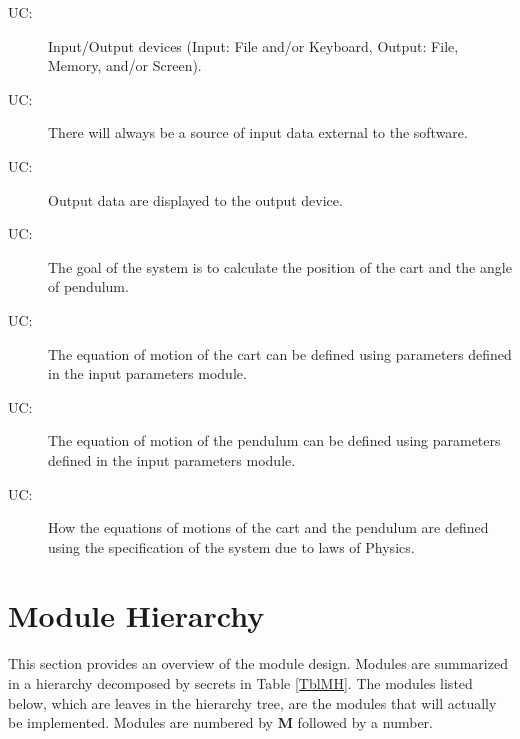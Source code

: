 \documentclass[12pt, titlepage]{article}
\newcounter{ucnum}
\newcommand{\uctheucnum}{UC\theucnum}
\begin{document}
\begin{description}
\item[ \uctheucnum \label{ucIO}:] Input/Output devices (Input: File and/or Keyboard, Output: File, Memory, and/or Screen).
\item[ \uctheucnum \label{ucInput}:] There will always be a source of input data external to the software.
\item[ \uctheucnum \label{ucOutput}:] Output data are displayed to the output device.
\item[ \uctheucnum \label{ucGoal}:] The goal of the system is to calculate the position of the cart and the angle of pendulum.
\item[ \uctheucnum \label{ucODEstructureC}:] The equation of motion of the cart can be defined using parameters defined in the input parameters module.
\item[ \uctheucnum \label{ucODEstructureP}:] The equation of motion of the pendulum can be defined using parameters defined in the input parameters module.
\item[ \uctheucnum \label{ucEqM}:] How the equations of motions of the cart and the pendulum are defined using the specification of the system due to laws of Physics.
 
\end{description}

\section{Module Hierarchy} \label{SecMH}

This section provides an overview of the module design. Modules are summarized in a hierarchy decomposed by secrets in Table \ref{TblMH}. The modules listed below, which are leaves in the hierarchy tree, are the modules that will actually be implemented. Modules are numbered by \textbf{M} followed by a number. 
\end{document}
